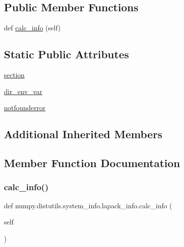 \subsection*{Public Member Functions}
\begin{DoxyCompactItemize}
\item 
def \hyperlink{classnumpy_1_1distutils_1_1system__info_1_1lapack__info_a8deb3e7bcf2b99f91ccadaad4931c614}{calc\+\_\+info} (self)
\end{DoxyCompactItemize}
\subsection*{Static Public Attributes}
\begin{DoxyCompactItemize}
\item 
\hyperlink{classnumpy_1_1distutils_1_1system__info_1_1lapack__info_a4f6a5882ef4b248dd0099e0e3f111455}{section}
\item 
\hyperlink{classnumpy_1_1distutils_1_1system__info_1_1lapack__info_a7ce58ed4ffab0301696458a3005050e5}{dir\+\_\+env\+\_\+var}
\item 
\hyperlink{classnumpy_1_1distutils_1_1system__info_1_1lapack__info_afff3b13fb0e9e5bb589e2005f67aebb4}{notfounderror}
\end{DoxyCompactItemize}
\subsection*{Additional Inherited Members}


\subsection{Member Function Documentation}
\mbox{\label{classnumpy_1_1distutils_1_1system__info_1_1lapack__info_a8deb3e7bcf2b99f91ccadaad4931c614}} 
\subsubsection{\texorpdfstring{calc\+\_\+info()}{calc\_info()}}
{\footnotesize\ttfamily def numpy.\+distutils.\+system\+\_\+info.\+lapack\+\_\+info.\+calc\+\_\+info (\begin{DoxyParamCaption}\item[{}]{self }\end{DoxyParamCaption})}



